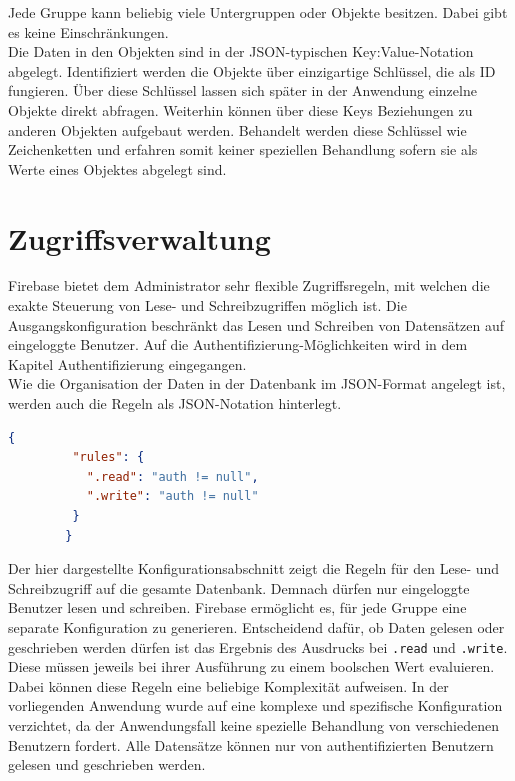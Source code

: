 Jede Gruppe kann beliebig viele Untergruppen oder Objekte besitzen. Dabei gibt es keine Einschränkungen.\\
Die Daten in den Objekten sind in der JSON-typischen Key:Value-Notation abgelegt.
Identifiziert werden die Objekte über einzigartige Schlüssel, die als ID fungieren.
Über diese Schlüssel lassen sich später in der Anwendung einzelne Objekte direkt abfragen.
Weiterhin können über diese Keys Beziehungen zu anderen Objekten aufgebaut werden.
Behandelt werden diese Schlüssel wie Zeichenketten und erfahren somit keiner speziellen Behandlung sofern sie als Werte eines Objektes abgelegt sind.

\section{Zugriffsverwaltung}
Firebase bietet dem Administrator sehr flexible Zugriffsregeln, mit welchen die exakte Steuerung von Lese- und Schreibzugriffen möglich ist.
Die Ausgangskonfiguration beschränkt das Lesen und Schreiben von Datensätzen auf eingeloggte Benutzer. Auf die Authentifizierung-Möglichkeiten wird in dem Kapitel Authentifizierung eingegangen.\\
Wie die Organisation der Daten in der Datenbank im JSON-Format angelegt ist, werden auch die Regeln als JSON-Notation hinterlegt.

       
       
\begin{lstlisting}[language=JSON, label=code_AccessRuleDatabase, caption=Beispiel-Konfiguration für Datenbankzugriffe]
		{
         "rules": {
           ".read": "auth != null",
           ".write": "auth != null"
         }
  		}
\end{lstlisting}

Der hier dargestellte Konfigurationsabschnitt zeigt die Regeln für den Lese- und Schreibzugriff auf die gesamte Datenbank. Demnach dürfen nur eingeloggte Benutzer lesen und schreiben. Firebase ermöglicht es, für jede Gruppe eine separate Konfiguration zu generieren.
Entscheidend dafür, ob Daten gelesen oder geschrieben werden dürfen ist das Ergebnis des Ausdrucks bei \texttt{.read} und \texttt{.write}. Diese müssen jeweils bei ihrer Ausführung zu einem boolschen Wert evaluieren. Dabei können diese Regeln eine beliebige
Komplexität aufweisen.
In der vorliegenden Anwendung wurde auf eine komplexe und spezifische Konfiguration verzichtet, da der Anwendungsfall keine spezielle Behandlung von verschiedenen Benutzern fordert.
Alle Datensätze können nur von authentifizierten Benutzern gelesen und geschrieben werden.

